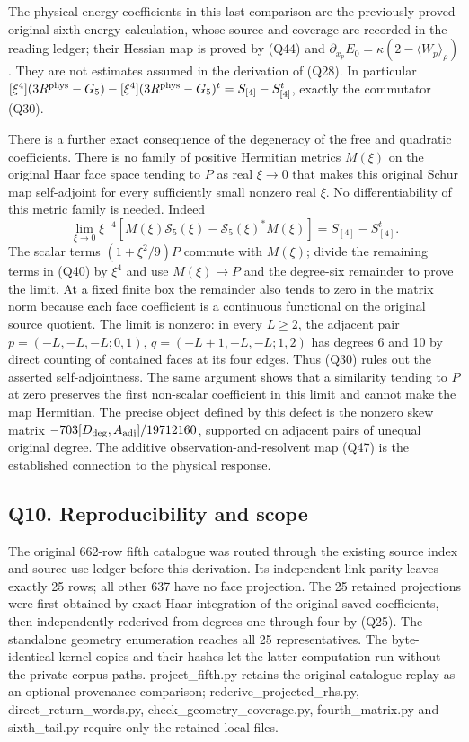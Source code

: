 \documentclass[11pt]{article}
\begin{document}
The physical energy coefficients in this last comparison are the previously proved original sixth-energy calculation, whose source and coverage are recorded in the reading ledger; their Hessian map is proved by (Q44) and \(\partial_{x_p}E_0=\kappa(2-\langle W_p\rangle_\rho)\). They are not estimates assumed in the derivation of (Q28). In particular \([\xi^4](3R^{\rm phys}-G_5)-[\xi^4](3R^{\rm phys}-G_5)^t=S_{[4]}-S_{[4]}^t\), exactly the commutator (Q30).

There is a further exact consequence of the degeneracy of the free and quadratic coefficients. There is no family of positive Hermitian metrics \(M(\xi)\) on the original Haar face space tending to \(P\) as real \(\xi\to0\) that makes this original Schur map self-adjoint for every sufficiently small nonzero real \(\xi\). No differentiability of this metric family is needed. Indeed
\[
 \lim_{\xi\to0}\xi^{-4}
 \left[M(\xi)\mathscr S_5(\xi)-\mathscr S_5(\xi)^*M(\xi)\right]
 =S_{[4]}-S_{[4]}^t .
 \tag{Q50}
\]
The scalar terms \((1+\xi^2/9)P\) commute with \(M(\xi)\); divide the remaining terms in (Q40) by \(\xi^4\) and use \(M(\xi)\to P\) and the degree-six remainder to prove the limit. At a fixed finite box the remainder also tends to zero in the matrix norm because each face coefficient is a continuous functional on the original source quotient. The limit is nonzero: in every \(L\ge2\), the adjacent pair \(p=(-L,-L,-L;0,1)\), \(q=(-L+1,-L,-L;1,2)\) has degrees 6 and 10 by direct counting of contained faces at its four edges. Thus (Q30) rules out the asserted self-adjointness. The same argument shows that a similarity tending to \(P\) at zero preserves the first non-scalar coefficient in this limit and cannot make the map Hermitian. The precise object defined by this defect is the nonzero skew matrix \(-703[D_{\rm deg},A_{\rm adj}]/19712160\), supported on adjacent pairs of unequal original degree. The additive observation-and-resolvent map (Q47) is the established connection to the physical response.

\subsection*{Q10. Reproducibility and scope}

The original 662-row fifth catalogue was routed through the existing source index and source-use ledger before this derivation. Its independent link parity leaves exactly 25 rows; all other 637 have no face projection. The 25 retained projections were first obtained by exact Haar integration of the original saved coefficients, then independently rederived from degrees one through four by (Q25). The standalone geometry enumeration reaches all 25 representatives. The byte-identical kernel copies and their hashes let the latter computation run without the private corpus paths. project\_fifth.py retains the original-catalogue replay as an optional provenance comparison; rederive\_projected\_rhs.py, direct\_return\_words.py, check\_geometry\_coverage.py, fourth\_matrix.py and sixth\_tail.py require only the retained local files.
\end{document}
